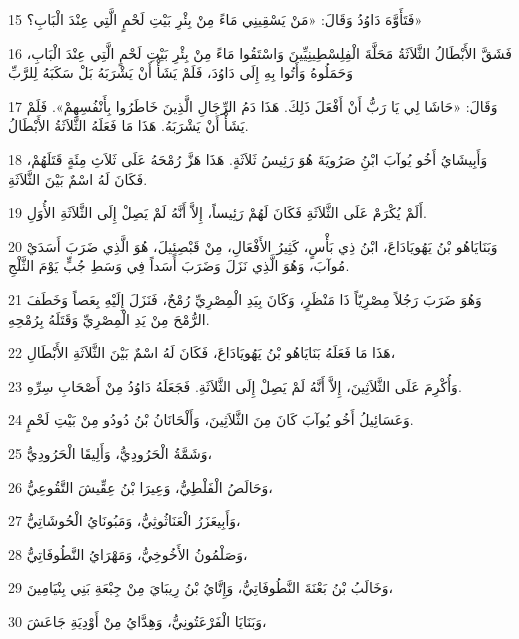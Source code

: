 \par 15 فَتَأَوَّهَ دَاوُدُ وَقَالَ: «مَنْ يَسْقِينِي مَاءً مِنْ بِئْرِ بَيْتِ لَحْمٍ الَّتِي عِنْدَ الْبَابِ؟»
\par 16 فَشَقَّ الأَبْطَالُ الثَّلاَثَةُ مَحَلَّةَ الْفِلِسْطِينِيِّينَ وَاسْتَقُوا مَاءً مِنْ بِئْرِ بَيْتِ لَحْمٍ الَّتِي عِنْدَ الْبَابِ، وَحَمَلُوهُ وَأَتُوا بِهِ إِلَى دَاوُدَ، فَلَمْ يَشَأْ أَنْ يَشْرَبَهُ بَلْ سَكَبَهُ لِلرَّبِّ
\par 17 وَقَالَ: «حَاشَا لِي يَا رَبُّ أَنْ أَفْعَلَ ذَلِكَ. هَذَا دَمُ الرِّجَالِ الَّذِينَ خَاطَرُوا بِأَنْفُسِهِمْ». فَلَمْ يَشَأْ أَنْ يَشْرَبَهُ. هَذَا مَا فَعَلَهُ الثَّلاَثَةُ الأَبْطَالُ.
\par 18 وَأَبِيشَايُ أَخُو يُوآبَ ابْنُِ صَرُويَةَ هُوَ رَئِيسُ ثَلاَثَةٍ. هَذَا هَزَّ رُمْحَهُ عَلَى ثَلاَثِ مِئَةٍ قَتَلَهُمْ، فَكَانَ لَهُ اسْمٌ بَيْنَ الثَّلاَثَةِ.
\par 19 أَلَمْ يُكْرَمْ عَلَى الثَّلاَثَةِ فَكَانَ لَهُمْ رَئِيساً، إِلاَّ أَنَّهُ لَمْ يَصِلْ إِلَى الثَّلاَثَةِ الأُوَلِ.
\par 20 وَبَنَايَاهُو بْنُ يَهُويَادَاعَ، ابْنُ ذِي بَأْسٍ، كَثِيرُ الأَفْعَالِ، مِنْ قَبْصِئِيلَ، هُوَ الَّذِي ضَرَبَ أَسَدَيْ مُوآبَ، وَهُوَ الَّذِي نَزَلَ وَضَرَبَ أَسَداً فِي وَسَطِ جُبٍّ يَوْمَ الثَّلْجِ.
\par 21 وَهُوَ ضَرَبَ رَجُلاً مِصْرِيّاً ذَا مَنْظَرٍ، وَكَانَ بِيَدِ الْمِصْرِيِّ رُمْحٌ، فَنَزَلَ إِلَيْهِ بِعَصاً وَخَطَفَ الرُّمْحَ مِنْ يَدِ الْمِصْرِيِّ وَقَتَلَهُ بِرُمْحِهِ.
\par 22 هَذَا مَا فَعَلَهُ بَنَايَاهُو بْنُ يَهُويَادَاعَ، فَكَانَ لَهُ اسْمٌ بَيْنَ الثَّلاَثَةِ الأَبْطَالِ،
\par 23 وَأُكْرِمَ عَلَى الثَّلاَثِينَ، إِلاَّ أَنَّهُ لَمْ يَصِلْ إِلَى الثَّلاَثَةِ. فَجَعَلَهُ دَاوُدُ مِنْ أَصْحَابِ سِرِّهِ.
\par 24 وَعَسَائِيلُ أَخُو يُوآبَ كَانَ مِنَ الثَّلاَثِينَ، وَأَلْحَانَانُ بْنُ دُودُو مِنْ بَيْتِ لَحْمٍ.
\par 25 وَشَمَّةُ الْحَرُودِيُّ، وَأَلِيقَا الْحَرُودِيُّ،
\par 26 وَحَالَصُ الْفَلْطِيُّ، وَعِيرَا بْنُ عِقِّيشَ التَّقُوعِيُّ،
\par 27 وَأَبِيعَزَرُ الْعَنَاثُوثِيُّ، وَمَبُونَايُ الْحُوشَاتِيُّ،
\par 28 وَصَلْمُونُ الأَخُوخِيُّ، وَمَهْرَايُ النَّطُوفَاتِيُّ،
\par 29 وَخَالَبُ بْنُ بَعْنَةَ النَّطُوفَاتِيُّ، وَإِتَّايُ بْنُ رِيبَايَ مِنْ جِبْعَةِ بَنِي بِنْيَامِينَ،
\par 30 وَبَنَايَا الْفَرْعَتُونِيُّ، وَهِدَّايُ مِنْ أَوْدِيَةِ جَاعَشَ،
